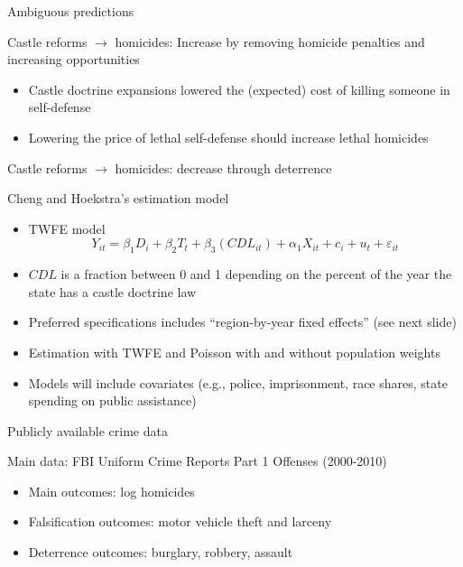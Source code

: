 \documentclass{beamer}
\begin{document}
\begin{frame}{Ambiguous predictions}
	
Castle reforms $\rightarrow$ homicides: Increase by removing homicide penalties and increasing opportunities
	\begin{itemize}
	\item Castle doctrine expansions lowered the (expected) cost of killing someone in self-defense
	\item Lowering the price of lethal self-defense should increase lethal homicides
	\end{itemize}
\bigskip
Castle reforms $\rightarrow$ homicides: decrease through deterrence

\end{frame}


\begin{frame}{Cheng and Hoekstra's estimation model}
	
	\begin{itemize}
	\item TWFE model$$Y_{it} = \beta_1 D_i + \beta_2 T_t + \beta_3 (CDL_{it}) + \alpha_1X_{it} + c_i + u_t + \varepsilon_{it}$$
	\item $CDL$ is a fraction between 0 and 1 depending on the percent of the year the state has a castle doctrine law 
	\item Preferred specifications includes ``region-by-year fixed effects'' (see next slide)
	\item Estimation with TWFE and Poisson with and without population weights
	\item Models will include covariates (e.g., police, imprisonment, race shares, state spending on public assistance)
	\end{itemize}
\end{frame}


\begin{frame}{Publicly available crime data}
	
Main data: FBI Uniform Crime Reports Part 1 Offenses (2000-2010)
		\begin{itemize}
		\item Main outcomes: log homicides
		\item Falsification outcomes: motor vehicle theft and larceny
		\item Deterrence outcomes: burglary, robbery, assault
		\end{itemize}
\end{frame}
\end{document}

